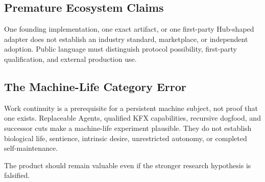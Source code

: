\subsection{Premature Ecosystem Claims}

One founding implementation, one exact artifact, or one first-party Hub-shaped
adapter does not establish an industry standard, marketplace, or independent
adoption. Public language must distinguish protocol possibility, first-party
qualification, and external production use.

\subsection{The Machine-Life Category Error}

Work continuity is a prerequisite for a persistent machine subject, not proof
that one exists. Replaceable Agents, qualified KFX capabilities, recursive
dogfood, and successor cuts make a machine-life experiment plausible. They do
not establish biological life, sentience, intrinsic desire, unrestricted
autonomy, or completed self-maintenance.

The product should remain valuable even if the stronger research hypothesis is
falsified.

